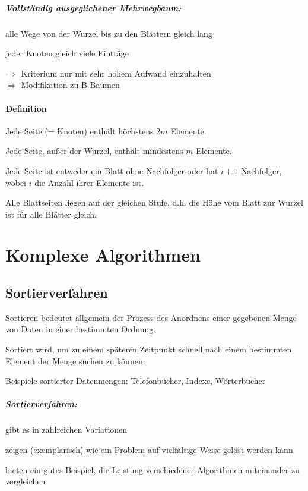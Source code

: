 \paragraph{Vollständig ausgeglichener Mehrwegbaum:}
\begin{compactitem}
	\item alle Wege von der Wurzel bis zu den Blättern gleich lang
	\item jeder Knoten gleich viele Einträge
\end{compactitem}
$\Rightarrow$ Kriterium nur mit sehr hohem Aufwand einzuhalten\\
$\Rightarrow$ Modifikation zu B-Bäumen

\subsubsection{Definition}
\begin{compactitem}
	\item Jede Seite (= Knoten) enthält höchstens $2m$ Elemente.
	\item Jede Seite, außer der Wurzel, enthält mindestens $m$ Elemente.
	\item Jede Seite ist entweder ein Blatt ohne Nachfolger oder hat $i + 1$ Nachfolger, wobei $i$ die Anzahl ihrer Elemente ist.
	\item Alle Blattseiten liegen auf der gleichen Stufe, d.h. die Höhe vom Blatt zur Wurzel ist für alle Blätter gleich.
\end{compactitem}

\chapter{Komplexe Algorithmen}
\section{Sortierverfahren}
\begin{compactitem}
	\item Sortieren bedeutet allgemein der Prozess des Anordnens einer gegebenen Menge von Daten in einer bestimmten Ordnung.
	\item Sortiert wird, um zu einem späteren Zeitpunkt schnell nach einem bestimmten Element der Menge suchen zu können.
	\item Beispiele sortierter Datenmengen: Telefonbücher, Indexe, Wörterbücher
\end{compactitem}

\paragraph{Sortierverfahren:}
\begin{compactitem}
	\item gibt es in zahlreichen Variationen
	\item zeigen (exemplarisch) wie ein Problem auf vielfältige Weise gelöst werden kann
	\item bieten ein gutes Beispiel, die Leistung verschiedener Algorithmen miteinander zu vergleichen
\end{compactitem}

